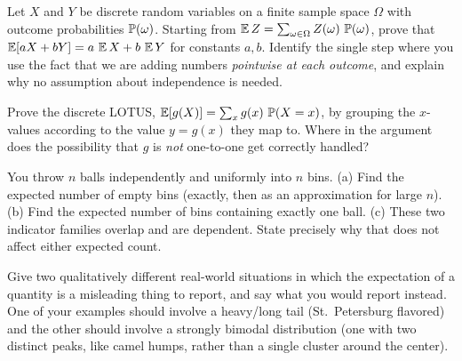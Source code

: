 \begin{exercise}
\label{ch08:exr-proof-linearity}
Let $X$ and $Y$ be discrete random variables on a finite sample space $\Omega$
with outcome probabilities $\P(\omega)$. Starting from $\E Z = \sum_{\omega \in
\Omega} Z(\omega)\,\P(\omega)$, prove that $\E[aX + bY] = a\,\E X + b\,\E Y$ for
constants $a, b$. Identify the single step where you use the fact that we are
adding numbers \emph{pointwise at each outcome}, and explain why no assumption
about independence is needed.
\end{exercise}

\begin{exercise}
\label{ch08:exr-proof-lotus}
Prove the discrete LOTUS, $\E[g(X)] = \sum_x g(x)\,\P(X=x)$, by grouping the
$x$-values according to the value $y = g(x)$ they map to. Where in the argument
does the possibility that $g$ is \emph{not} one-to-one get correctly handled?
\end{exercise}

\begin{exercise}
\label{ch08:exr-balls}
You throw $n$ balls independently and uniformly into $n$ bins.
(a) Find the expected number of empty bins (exactly, then as an approximation for
large $n$).
(b) Find the expected number of bins containing exactly one ball.
(c) These two indicator families overlap and are dependent. State precisely why
that does not affect either expected count.
\end{exercise}

\begin{exercise}
\label{ch08:exr-conceptual}
Give two qualitatively different real-world situations in which the expectation of
a quantity is a misleading thing to report, and say what you would report instead.
One of your examples should involve a heavy/long tail (St.\ Petersburg flavored)
and the other should involve a strongly bimodal distribution (one with two distinct
peaks, like camel humps, rather than a single cluster around the center).
\end{exercise}
